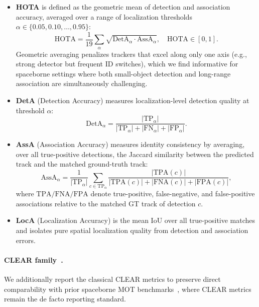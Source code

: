 \documentclass{article}
\begin{document}
\begin{itemize}
    \item \textbf{HOTA} is defined as the geometric mean of detection and
    association accuracy, averaged over a range of localization
    thresholds $\alpha \in \{0.05, 0.10, \ldots, 0.95\}$:
    \begin{equation}
        \mathrm{HOTA} = \frac{1}{19}\sum_{\alpha}
        \sqrt{\mathrm{DetA}_{\alpha} \cdot \mathrm{AssA}_{\alpha}},
        \quad \mathrm{HOTA} \in [0, 1].
    \end{equation}
    Geometric averaging penalizes trackers that excel along only one
    axis (e.g., strong detector but frequent ID switches), which we find
    informative for spaceborne settings where both small-object detection
    and long-range association are simultaneously challenging.

    \item \textbf{DetA} (Detection Accuracy) measures localization-level
    detection quality at threshold $\alpha$:
    \begin{equation}
        \mathrm{DetA}_{\alpha} =
        \frac{|\mathrm{TP}_{\alpha}|}{|\mathrm{TP}_{\alpha}| +
        |\mathrm{FN}_{\alpha}| + |\mathrm{FP}_{\alpha}|}.
    \end{equation}

    \item \textbf{AssA} (Association Accuracy) measures identity
    consistency by averaging, over all true-positive detections, the
    Jaccard similarity between the predicted track and the matched
    ground-truth track:
    \begin{equation}
        \mathrm{AssA}_{\alpha} = \frac{1}{|\mathrm{TP}_{\alpha}|}
        \sum_{c \in \mathrm{TP}_{\alpha}}
        \frac{|\mathrm{TPA}(c)|}{|\mathrm{TPA}(c)| + |\mathrm{FNA}(c)| +
        |\mathrm{FPA}(c)|},
    \end{equation}
    where $\mathrm{TPA}/\mathrm{FNA}/\mathrm{FPA}$ denote true-positive,
    false-negative, and false-positive associations relative to the
    matched GT track of detection $c$.

    \item \textbf{LocA} (Localization Accuracy) is the mean IoU over all
    true-positive matches and isolates pure spatial localization quality
    from detection and association errors.
\end{itemize}

\paragraph{CLEAR family~\citep{bernardin2008clear}.}
We additionally report the classical CLEAR metrics to preserve direct
comparability with prior spaceborne MOT
benchmarks~\citep{Li2023SATMTB,He2022TGraM}, where CLEAR metrics remain
the de facto reporting standard.
\end{document}
